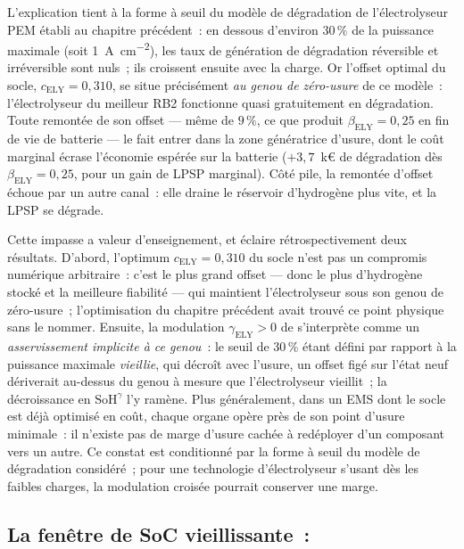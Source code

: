 L'explication tient à la forme à seuil du modèle de dégradation de l'électrolyseur PEM établi au chapitre précédent~: en dessous d'environ $30\,\%$ de la puissance maximale (soit \SI{1}{\ampere\per\centi\metre\squared}), les taux de génération de dégradation réversible et irréversible sont nuls~; ils croissent ensuite avec la charge. Or l'offset optimal du socle, $c_{\text{ELY}} = 0{,}310$, se situe précisément \emph{au genou de zéro-usure} de ce modèle~: l'électrolyseur du meilleur RB2 fonctionne quasi gratuitement en dégradation. Toute remontée de son offset — même de $9\,\%$, ce que produit $\beta_{\text{ELY}} = 0{,}25$ en fin de vie de batterie — le fait entrer dans la zone génératrice d'usure, dont le coût marginal écrase l'économie espérée sur la batterie ($+3{,}7$~k€ de dégradation dès $\beta_{\text{ELY}} = 0{,}25$, pour un gain de LPSP marginal). Côté pile, la remontée d'offset échoue par un autre canal~: elle draine le réservoir d'hydrogène plus vite, et la LPSP se dégrade.

Cette impasse a valeur d'enseignement, et éclaire rétrospectivement deux résultats. D'abord, l'optimum $c_{\text{ELY}} = 0{,}310$ du socle n'est pas un compromis numérique arbitraire~: c'est le plus grand offset — donc le plus d'hydrogène stocké et la meilleure fiabilité — qui maintient l'électrolyseur sous son genou de zéro-usure~; l'optimisation du chapitre précédent avait trouvé ce point physique sans le nommer. Ensuite, la modulation $\gamma_{\text{ELY}} > 0$ de \RBsohH{} s'interprète comme un \emph{asservissement implicite à ce genou}~: le seuil de $30\,\%$ étant défini par rapport à la puissance maximale \emph{vieillie}, qui décroît avec l'usure, un offset figé sur l'état neuf dériverait au-dessus du genou à mesure que l'électrolyseur vieillit~; la décroissance en $\mathrm{SoH}^{\gamma}$ l'y ramène. Plus généralement, dans un EMS dont le socle est déjà optimisé en coût, chaque organe opère près de son point d'usure minimale~: il n'existe pas de marge d'usure cachée à redéployer d'un composant vers un autre. Ce constat est conditionné par la forme à seuil du modèle de dégradation considéré~; pour une technologie d'électrolyseur s'usant dès les faibles charges, la modulation croisée pourrait conserver une marge.

\subsection{La fenêtre de SoC vieillissante~: \RBsohB}
\label{subsec:rb2sohbat}

